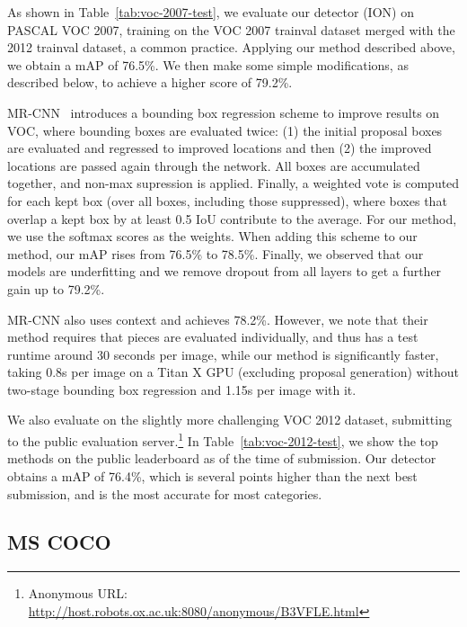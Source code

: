 \documentclass[10pt,twocolumn,letterpaper]{article}
\begin{document}
As shown in Table~\ref{tab:voc-2007-test}, we evaluate our detector (ION) on PASCAL
VOC 2007, training on the VOC 2007 trainval dataset merged with the 2012
trainval dataset, a common practice.  Applying our method described above, we obtain a mAP of
76.5\%.  We then make some simple modifications, as described below, to achieve
a higher score of 79.2\%.

MR-CNN~\cite{MR-CNN} introduces a bounding box regression scheme to improve
results on VOC, where bounding boxes are evaluated twice: (1) the initial
proposal boxes are evaluated and regressed to improved locations and then (2)
the improved locations are passed again through the network.  All boxes are
accumulated together, and non-max supression is applied.  Finally, a weighted
vote is computed for each kept box (over all boxes, including those
suppressed), where boxes that overlap a kept box by at least 0.5 IoU contribute
to the average.  For our method, we use the softmax scores as the weights.
When adding this scheme to our method, our mAP rises from 76.5\% to 78.5\%.
Finally, we observed that our models are underfitting and we remove dropout from
all layers to get a further gain up to 79.2\%.

MR-CNN also uses context and achieves 78.2\%.  However, we note that their
method requires that pieces are evaluated individually, and thus has a test
runtime around 30 seconds per image, while our method is significantly faster,
taking 0.8s per image on a Titan X GPU (excluding proposal generation) without
two-stage bounding box regression and 1.15s per image with it.

We also evaluate on the slightly more challenging VOC 2012 dataset, submitting
to the public evaluation server.\footnote{Anonymous URL:
\tiny{\url{http://host.robots.ox.ac.uk:8080/anonymous/B3VFLE.html}}}
In Table~\ref{tab:voc-2012-test}, we show the top methods on the public
leaderboard as of the time of submission.  Our detector obtains a mAP of 76.4\%,
which is several points higher than the next best submission, and is the most
accurate for most categories.

\subsection{MS COCO}\label{sec:results-mscoco}
\end{document}
